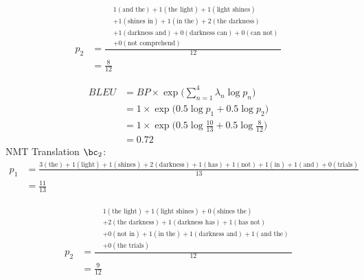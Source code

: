 {\begin{parts}
\begin{subparts}
{        \begin{align*}
            p_2 &= \frac{\begin{aligned}
                &1 (\text{and the}) + 1 (\text{the light}) + 1 (\text{light shines}) \\
                &+ 1 (\text{shines in}) + 1 (\text{in the}) + 2 (\text{the darkness}) \\
                &+ 1 (\text{darkness and}) + 0 (\text{darkness can}) + 0 (\text{can not}) \\
                &+ 0 (\text{not comprehend})
              \end{aligned}}{12} \\
            &= \frac{8}{12}
        \end{align*}

        \begin{align*}
            BLEU &= BP \times \exp \Big( \sum_{n=1}^4 \lambda_n \log p_n \Big) \\
            &= 1 \times \exp \Big( 0.5 \log p_1 + 0.5 \log p_2\Big) \\
            &= 1 \times \exp \Big( 0.5 \log \frac{10}{13} + 0.5 \log \frac{8}{12} \Big) \\
            &= 0.72
        \end{align*}
        NMT Translation $\bc_2$:
        \begin{align*}
            p_1 &= \frac{3 (\text{the}) + 1 (\text{light}) + 1 (\text{shines}) + 2 (\text{darkness}) + 1 (\text{has}) + 1 (\text{not}) + 1 (\text{in}) + 1 (\text{and}) + 0 (\text{trials})}{13} \\
            &= \frac{11}{13}
        \end{align*}

        \begin{align*}
            p_2 &= \frac{\begin{aligned}
                &1 (\text{the light}) + 1 (\text{light shines}) + 0 (\text{shines the}) \\
                &+ 2 (\text{the darkness}) + 1 (\text{darkness has}) + 1 (\text{has not}) \\
                &+ 0 (\text{not in}) + 1 (\text{in the}) + 1 (\text{darkness and}) + 1 (\text{and the}) \\
                &+ 0 (\text{the trials})
              \end{aligned}}{12} \\
            &= \frac{9}{12}
        \end{align*}

}
\end{subparts}
\end{parts}}
